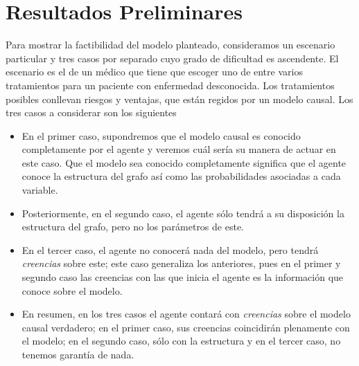 \documentclass[11pt]{article}
\theoremstyle{plain}
\begin{document}
\section{Resultados Preliminares}
Para mostrar la factibilidad del modelo planteado, consideramos un escenario particular y tres casos por separado cuyo grado de dificultad es ascendente. El escenario es el de un médico que tiene que escoger uno de entre varios tratamientos para un paciente con enfermedad desconocida. Los tratamientos posibles conllevan riesgos y ventajas, que están regidos por un modelo causal. Los tres casos a considerar son los siguientes
\begin{itemize}
\item En el primer caso, supondremos que el modelo causal es conocido completamente por el agente y veremos cuál sería su manera de actuar en este caso. Que el modelo sea conocido completamente significa que el agente conoce la estructura del grafo así como las probabilidades asociadas a cada variable.
\item Posteriormente, en el segundo caso, el agente sólo tendrá a su disposición la estructura del grafo, pero no los parámetros de este. 
\item En el tercer caso, el agente no conocerá nada del modelo, pero tendrá \textit{creencias} sobre este; este caso generaliza los anteriores, pues en el primer y segundo caso las creencias con las que inicia el agente es la información que conoce sobre el modelo.
\item  En resumen, en los tres casos el agente contará con \textit{creencias} sobre el modelo causal verdadero; en el primer caso, sus creencias coincidirán plenamente con el modelo; en el segundo caso, sólo con la estructura y en el tercer caso, no tenemos garantía de nada. 
\end{itemize}
\end{document}
